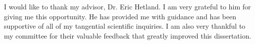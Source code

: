 I would like to thank my advisor, Dr. Eric Hetland. I am very grateful to him for giving me this opportunity. He has provided me with guidance and has been supportive of all of my tangential scientific inquiries. I am also very thankful to my committee for their valuable feedback that greatly improved this dissertation. 



